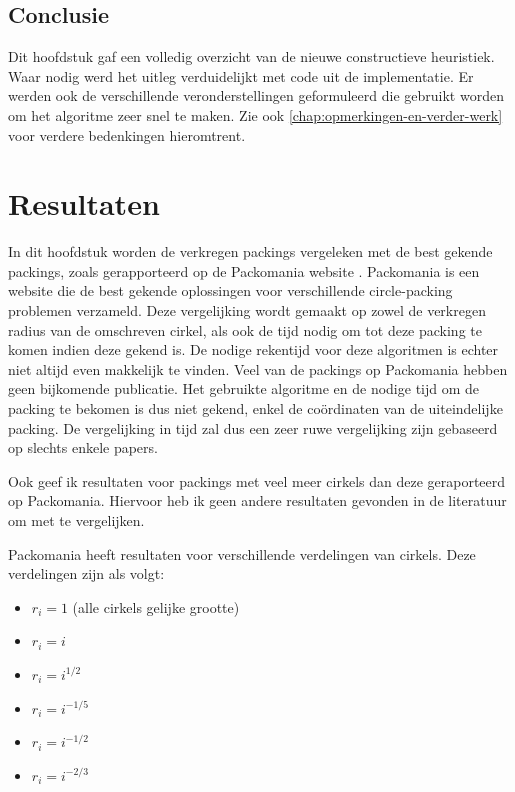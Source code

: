 \documentclass[12pt,a4paper,oneside]{book}
\begin{document}
\section{Conclusie}

Dit hoofdstuk gaf een volledig overzicht van de nieuwe constructieve heuristiek.
Waar nodig werd het uitleg verduidelijkt met code uit de implementatie.
Er werden ook de verschillende veronderstellingen geformuleerd die gebruikt worden om het algoritme zeer snel te maken.
Zie ook \autoref{chap:opmerkingen-en-verder-werk} voor verdere bedenkingen hieromtrent.

\chapter{Resultaten} \label{chap:resultaten}

In dit hoofdstuk worden de verkregen packings vergeleken met de best gekende packings, zoals gerapporteerd op de Packomania website \cite{packomania}.
Packomania is een website die de best gekende oplossingen voor verschillende circle-packing problemen verzameld.
Deze vergelijking wordt gemaakt op zowel de verkregen radius van de omschreven cirkel, als ook de tijd nodig om tot deze packing te komen indien deze gekend is.
De nodige rekentijd voor deze algoritmen is echter niet altijd even makkelijk te vinden.
Veel van de packings op Packomania hebben geen bijkomende publicatie.
Het gebruikte algoritme en de nodige tijd om de packing te bekomen is dus niet gekend, enkel de coördinaten van de uiteindelijke packing.
De vergelijking in tijd zal dus een zeer ruwe vergelijking zijn gebaseerd op slechts enkele papers.

Ook geef ik resultaten voor packings met veel meer cirkels dan deze geraporteerd op Packomania.
Hiervoor heb ik geen andere resultaten gevonden in de literatuur om met te vergelijken.

Packomania heeft resultaten voor verschillende verdelingen van cirkels.
Deze verdelingen zijn als volgt:

\begin{itemize}
	\item $r_i=1$ (alle cirkels gelijke grootte)
	\item $r_i=i$
	\item $r_i=i^{1/2}$
	\item $r_i=i^{-1/5}$
	\item $r_i=i^{-1/2}$
	\item $r_i=i^{-2/3}$
\end{itemize}
\end{document}
